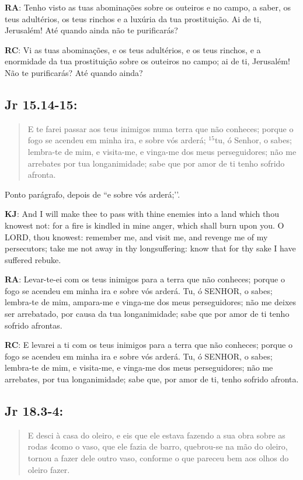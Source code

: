 \textbf{RA}: Tenho visto as tuas abominações sobre os outeiros e no campo, a saber, os teus adultérios, os teus rinchos e a luxúria da tua prostituição. Ai de ti, Jerusalém! Até quando ainda não te purificarás?

\textbf{RC}: Vi as tuas abominações, e os teus adultérios, e os teus rinchos, e a enormidade da tua prostituição sobre os outeiros no campo; ai de ti, Jerusalém! Não te purificarás? Até quando ainda?

\subsection*{Jr 15.14-15:} 
 \begin{quote}
  \small
 E te farei passar aos teus inimigos numa terra que não conheces; porque o fogo se acendeu em minha ira, e sobre vós arderá; $^{\mathrm{15}}$tu, ó Senhor, o sabes; lembra-te de mim, e visita-me, e vinga-me dos meus perseguidores; não me arrebates por tua longanimidade; sabe que por amor de ti tenho sofrido afronta.
 \end{quote}

Ponto parágrafo, depois de ``e sobre vós arderá;’’.

\textbf{KJ}: And I will make thee to pass with thine enemies into a land which thou knowest not: for a fire is kindled in mine anger, which shall burn upon you.
O LORD, thou knowest: remember me, and visit me, and revenge me of my persecutors; take me not away in thy longsuffering: know that for thy sake I have suffered rebuke.

\textbf{RA}: Levar-te-ei com os teus inimigos para a terra que não conheces; porque o fogo se acendeu em minha ira e sobre vós arderá.
Tu, ó SENHOR, o sabes; lembra-te de mim, ampara-me e vinga-me dos meus perseguidores; não me deixes ser arrebatado, por causa da tua longanimidade; sabe que por amor de ti tenho sofrido afrontas.

\textbf{RC}: E levarei a ti com os teus inimigos para a terra que não conheces; porque o fogo se acendeu em minha ira e sobre vós arderá.
Tu, ó SENHOR, o sabes; lembra-te de mim, e visita-me, e vinga-me dos meus perseguidores; não me arrebates, por tua longanimidade; sabe que, por amor de ti, tenho sofrido afronta.

\subsection*{Jr 18.3-4:} 
 \begin{quote}
  \small
 E desci à casa do oleiro, e eis que ele estava fazendo a sua obra sobre as rodas\uwave{,} 4como o vaso, que ele fazia de barro, quebrou-se na mão do oleiro, tornou a fazer dele outro vaso, conforme o que pareceu bem aos olhos do oleiro fazer.
 \end{quote}

